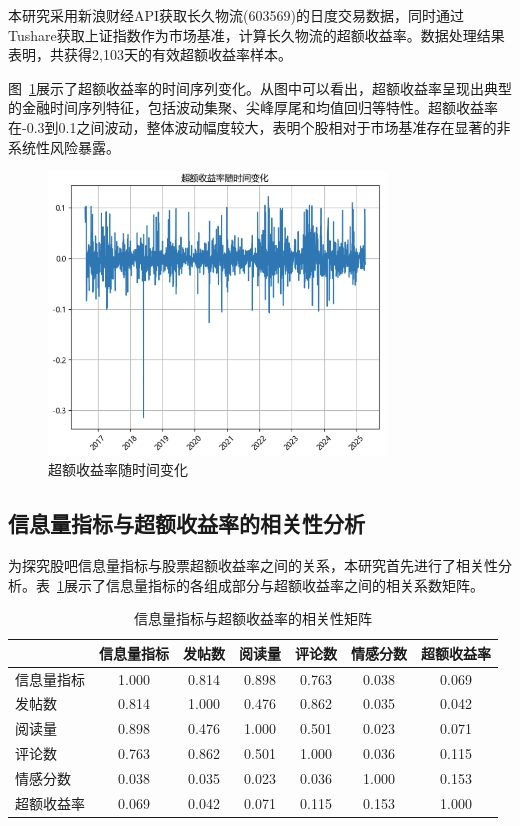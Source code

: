 \documentclass[12pt, a4paper]{article}
\begin{document}
本研究采用新浪财经API获取长久物流(603569)的日度交易数据，同时通过Tushare获取上证指数作为市场基准，计算长久物流的超额收益率。数据处理结果表明，共获得2,103天的有效超额收益率样本。

图~\ref{fig:excess_return_time}展示了超额收益率的时间序列变化。从图中可以看出，超额收益率呈现出典型的金融时间序列特征，包括波动集聚、尖峰厚尾和均值回归等特性。超额收益率在-0.3到0.1之间波动，整体波动幅度较大，表明个股相对于市场基准存在显著的非系统性风险暴露。

\begin{figure}[htbp]
\centering
\includegraphics[width=0.8\textwidth]{fig/excess_return_time.png}
\caption{超额收益率随时间变化}
\label{fig:excess_return_time}
\end{figure}

\subsection{信息量指标与超额收益率的相关性分析}

为探究股吧信息量指标与股票超额收益率之间的关系，本研究首先进行了相关性分析。表~\ref{tab:correlation}展示了信息量指标的各组成部分与超额收益率之间的相关系数矩阵。

\begin{table}[htbp]
\centering
\caption{信息量指标与超额收益率的相关性矩阵}
\label{tab:correlation}
\begin{tabular}{lcccccc}
\toprule
 & 信息量指标 & 发帖数 & 阅读量 & 评论数 & 情感分数 & 超额收益率 \\
\midrule
信息量指标 & 1.000 & 0.814 & 0.898 & 0.763 & 0.038 & 0.069 \\
发帖数 & 0.814 & 1.000 & 0.476 & 0.862 & 0.035 & 0.042 \\
阅读量 & 0.898 & 0.476 & 1.000 & 0.501 & 0.023 & 0.071 \\
评论数 & 0.763 & 0.862 & 0.501 & 1.000 & 0.036 & 0.115 \\
情感分数 & 0.038 & 0.035 & 0.023 & 0.036 & 1.000 & 0.153 \\
超额收益率 & 0.069 & 0.042 & 0.071 & 0.115 & 0.153 & 1.000 \\
\bottomrule
\end{tabular}
\end{table}
\end{document}
